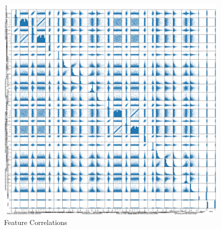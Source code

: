 \documentclass[extendedabs]{recpad2k}
\begin{document}
\appendix
\begin{figure}[h]
   \centering
   \includegraphics[width=2\linewidth]{featurecorrelation.png}
   \caption{Feature Correlations}
   \label{fig:feature}
\end{figure}
\end{document}
